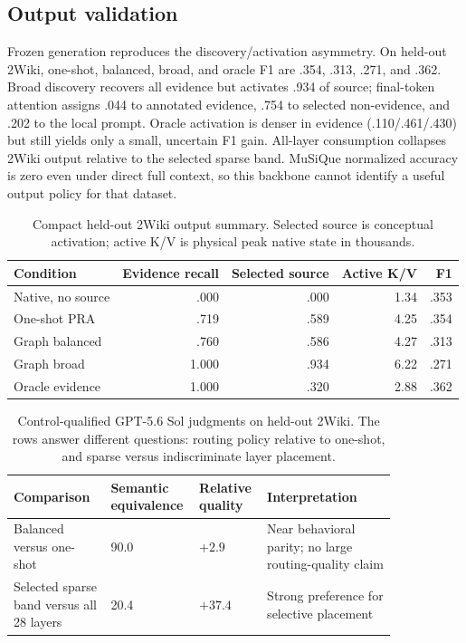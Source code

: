 \subsection{Output validation}

Frozen generation reproduces the discovery/activation asymmetry.  On held-out 2Wiki, one-shot,
balanced, broad, and oracle F1 are .354, .313, .271, and .362.  Broad discovery recovers all evidence
but activates .934 of source; final-token attention assigns .044 to annotated evidence, .754 to
selected non-evidence, and .202 to the local prompt.  Oracle activation is denser in evidence
(.110/.461/.430) but still yields only a small, uncertain F1 gain.  All-layer consumption collapses
2Wiki output relative to the selected sparse band.  MuSiQue normalized accuracy is zero even under
direct full context, so this backbone cannot identify a useful output policy for that dataset.

\begin{table}[H]
\centering
\caption{Compact held-out 2Wiki output summary.  Selected source is conceptual activation; active
K/V is physical peak native state in thousands.}
\label{tab:main-output}
\small
\begin{tabular}{lrrrr}
\toprule
Condition & Evidence recall & Selected source & Active K/V & F1 \\
\midrule
Native, no source & .000 & .000 & 1.34 & .353 \\
One-shot PRA & .719 & .589 & 4.25 & .354 \\
Graph balanced & .760 & .586 & 4.27 & .313 \\
Graph broad & 1.000 & .934 & 6.22 & .271 \\
Oracle evidence & 1.000 & .320 & 2.88 & .362 \\
\bottomrule
\end{tabular}
\end{table}

\begin{table}[H]
\centering
\caption{Control-qualified GPT-5.6 Sol judgments on held-out 2Wiki.  The rows answer different
questions: routing policy relative to one-shot, and sparse versus indiscriminate layer placement.}
\label{tab:judge-separation}
\small
\begin{tabular}{p{0.24\linewidth}p{0.15\linewidth}p{0.13\linewidth}p{0.32\linewidth}}
\toprule
Comparison & Semantic equivalence & Relative quality & Interpretation \\
\midrule
Balanced versus one-shot & 90.0 & $+2.9$ & Near behavioral parity; no large routing-quality claim \\
Selected sparse band versus all 28 layers & 20.4 & $+37.4$ & Strong preference for selective placement \\
\bottomrule
\end{tabular}
\end{table}

